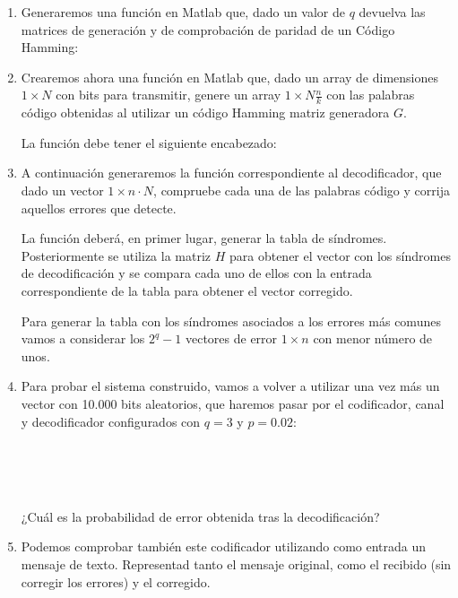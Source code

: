 \documentclass[es,practica,12pt]{uah}
\begin{document}
	\begin{enumerate}
	
		\item \textrm{Generaremos una función en Matlab que, dado un valor de $q$ devuelva las matrices de generación y de comprobación de paridad de un Código Hamming:}
		
		
	
		\item \textrm{Crearemos ahora una función en Matlab que, dado un array de dimensiones $1 \times N$ con bits para transmitir, genere un array $1 \times N \frac{n}{k}$ con las palabras código obtenidas al utilizar un código Hamming matriz generadora $G$.}
	
			\textrm{La función debe tener el siguiente encabezado:}
			
	
	
		\item \textrm{A continuación generaremos la función correspondiente al decodificador, que dado un vector $1 \times n\cdot N$, compruebe cada una de las palabras código y corrija aquellos errores que detecte.}
		
				
			\textrm{La función deberá, en primer lugar, generar la tabla de síndromes. Posteriormente se utiliza la matriz $H$ para obtener el vector con los síndromes de decodificación y se compara cada uno de ellos con la entrada correspondiente de la tabla para obtener el vector corregido.}
			
			\textrm{Para generar la tabla con los síndromes asociados a los errores más comunes vamos a considerar los $2^q-1$ vectores de error $1 \times n$ con menor número de unos.}
			
		\item \textrm{Para probar el sistema construido, vamos a volver a utilizar una vez más un vector con 10.000 bits aleatorios, que haremos pasar por el codificador, canal y decodificador configurados con $q=3$ y $p=0.02$:}
		
				\\
				\\
				\\
		
			\textrm{¿Cuál es la probabilidad de error obtenida tras la decodificación? }
			\item Podemos comprobar también este codificador utilizando como entrada un mensaje de texto. Representad tanto el mensaje original, como el recibido (sin corregir los errores) y el corregido. 
	\end{enumerate}
\end{document}
